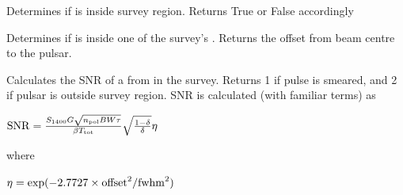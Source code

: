 \documentclass[letterpaper,10pt,english]{sphinxmanual}
\begin{document}
\begin{fulllineitems}
\label{\detokenize{module-level-docs:survey.Survey.inRegion}}
\pysigstartsignatures
\pysiglinewithargsret
{}
{}
{}
\pysigstopsignatures
\sphinxAtStartPar
Determines if  is inside survey region. Returns True or False accordingly

\end{fulllineitems}


\begin{fulllineitems}
\label{\detokenize{module-level-docs:survey.Survey.inPointing}}
\pysigstartsignatures
\pysiglinewithargsret
{}
{}
{}
\pysigstopsignatures
\sphinxAtStartPar
Determines if  is inside one of the survey’s . Returns the offset from beam centre to the pulsar.

\end{fulllineitems}


\begin{fulllineitems}
\label{\detokenize{module-level-docs:survey.Survey.SNRcalc}}
\pysigstartsignatures
\pysiglinewithargsret
{}
{\sphinxparamcomma {}}
{}
\pysigstopsignatures
\sphinxAtStartPar
Calculates the SNR of a  from   in the survey. Returns \sphinxhyphen{}1 if pulse is smeared, and \sphinxhyphen{}2 if pulsar is outside survey region. SNR is calculated (with familiar terms) as

\sphinxAtStartPar
\({\rm{SNR}} = \frac{S_{1400} G \sqrt{n_{\rm{pol}} BW \tau}}{\beta T_{\rm{tot}}} \sqrt{\frac{1-\delta}{\delta}} \eta\)

\sphinxAtStartPar
where

\sphinxAtStartPar
\(\eta = \exp(-2.7727 \times {\rm{offset}}^2 / {\rm{fwhm}}^2)\)

\end{fulllineitems}
\end{document}
